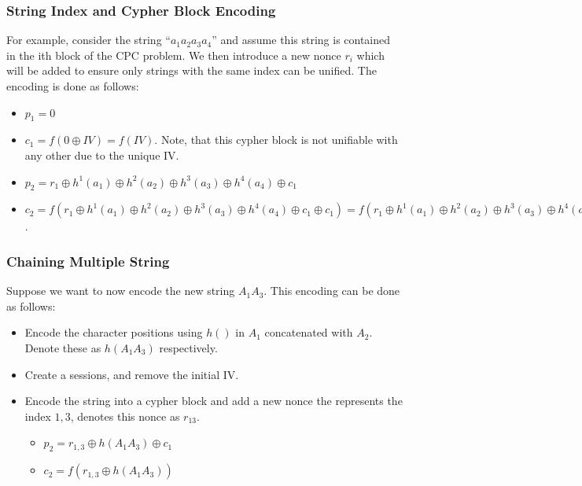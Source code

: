 \documentclass[11pt,twoside,a4paper]{article}
\begin{document}
{\subsubsection{String Index and Cypher Block Encoding}

For example, consider the string ``$a_1a_2a_3a_4$'' and assume
this string is contained in the ith block of the CPC problem.
We then introduce a new nonce $r_i$ which will be added to ensure
only strings with the same index can be unified. 
The encoding is done as follows:
\begin{itemize}
	\item $p_1 = 0$
	\item $c_1 = f(0 \oplus IV) = f(IV)$. 
	Note, that this cypher block is 
	not unifiable with any other due to the unique IV.
	\item $p_2 = r_1 \oplus h^1(a_1) \oplus h^2(a_2) \oplus h^3(a_3) \oplus h^4(a_4) \oplus c_1$
	\item $c_2 = f(r_1 \oplus h^1(a_1) \oplus h^2(a_2) \oplus h^3(a_3) \oplus h^4(a_4) \oplus c_1 \oplus c_1) = 
	f(r_1 \oplus h^1(a_1) \oplus h^2(a_2) \oplus h^3(a_3) \oplus h^4(a_4))$. 
\end{itemize} 


\subsubsection{Chaining Multiple String}
Suppose we want to now encode the new string $A_1 A_3$.
This encoding can be done as follows:
\begin{itemize}
	\item Encode the character positions using $h()$ in
	$A_1$ concatenated with $A_2$. 
	Denote these as $h(A_1A_3)$
	respectively. 
	\item Create a sessions, and remove the initial IV.
	\item Encode the string into a cypher block and add 
	a new nonce the represents the index $1,3$, denotes this
	nonce as $r_{13}$.
	\begin{itemize}
		\item $p_2= r_{1,3} \oplus h(A_1 A_3) \oplus c_1$
		\item $c_2 = f(r_{1,3} \oplus h(A_1 A_3))$
	\end{itemize} 
\end{itemize}

}
\end{document}
